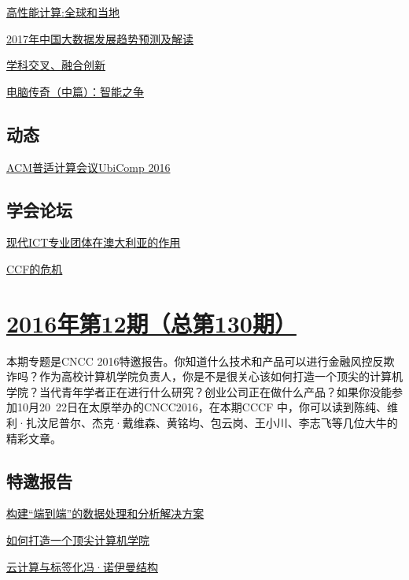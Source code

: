 \documentclass[a4paper]{article}
\begin{document}
\href{http://history.ccf.org.cn/resources/1190201776262/2017/01/11/David.pdf}{高性能计算:全球和当地}

\href{http://history.ccf.org.cn/resources/1190201776262/2017/01/11/bigdata.pdf}{2017年中国大数据发展趋势预测及解读}

\href{http://history.ccf.org.cn/resources/1190201776262/2017/01/11/shiyuanchun.pdf}{学科交叉、融合创新}

\href{http://history.ccf.org.cn/resources/1190201776262/2017/01/11/huangtiejun.pdf}{电脑传奇（中篇）：智能之争}

\subsection{动态}
\href{http://history.ccf.org.cn/resources/1190201776262/2017/01/11/dongtai.pdf}{ACM普适计算会议UbiComp 2016}

\subsection{学会论坛}
\href{http://history.ccf.org.cn/resources/1190201776262/2017/01/11/Andrew Johnson.pdf}{现代ICT专业团体在澳大利亚的作用}

\href{http://history.ccf.org.cn/resources/1190201776262/2017/01/11/duzide.pdf}{CCF的危机}


\section{\href{http://history.ccf.org.cn/sites/ccf/jsjtbbd.jsp?contentId=2963156880906}{\textbf{2016年第12期（总第130期）}}}
本期专题是CNCC 2016特邀报告。你知道什么技术和产品可以进行金融风控反欺诈吗？作为高校计算机学院负责人，你是不是很关心该如何打造一个顶尖的计算机学院？当代青年学者正在进行什么研究？创业公司正在做什么产品？如果你没能参加10月20~22日在太原举办的CNCC2016，在本期CCCF 中，你可以读到陈纯、维利·扎汶尼普尔、杰克·戴维森、黄铭均、包云岗、王小川、李志飞等几位大牛的精彩文章。
\subsection{特邀报告}
\href{http://history.ccf.org.cn/resources/1190201776262/2016/12/13/4huangmingjun.pdf}{构建“端到端”的数据处理和分析解决方案}

\href{http://history.ccf.org.cn/resources/1190201776262/2016/12/13/2Willy Zwaenepoel.pdf}{如何打造一个顶尖计算机学院}

\href{http://history.ccf.org.cn/resources/1190201776262/2016/12/13/5baoyungang.pdf}{云计算与标签化冯·诺伊曼结构}
\end{document}
